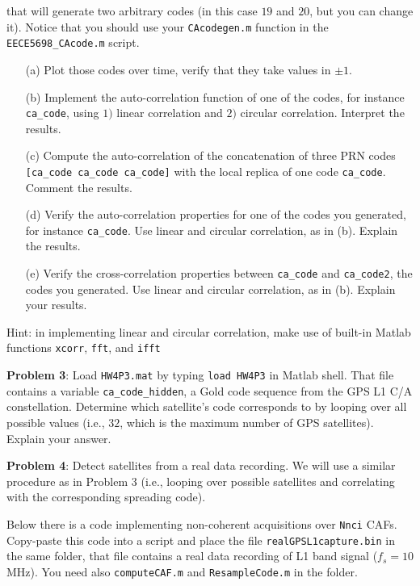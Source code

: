 \documentclass[11pt]{article}
\begin{document}
\noindent that will generate two arbitrary codes (in this case $19$ and $20$, but you can change it). Notice that you should use your \verb|CAcodegen.m| function in the \verb|EECE5698_CAcode.m| script. 

\begin{enumerate}
\item[(a)] Plot those codes over time, verify that they take values in $\pm1$. 
\item[(b)] Implement the auto-correlation function of one of the codes, for instance  \verb|ca_code|, using $1)$ linear correlation and $2)$ circular correlation. Interpret the results.
\item[(c)] Compute the auto-correlation of the concatenation of three PRN codes \verb|[ca_code ca_code ca_code]| with the local replica of one code \verb|ca_code|. Comment the results. 
\item[(d)] Verify the auto-correlation properties for one of the codes you generated, for instance \verb|ca_code|. Use linear and circular correlation, as in (b). Explain the results.
\item[(e)] Verify the cross-correlation properties between \verb|ca_code| and \verb|ca_code2|, the codes you generated. Use linear and circular correlation, as in (b). Explain your results.
\end{enumerate}

Hint: in implementing linear and circular correlation, make use of built-in Matlab functions \verb|xcorr|, \verb|fft|, and \verb|ifft|

\vspace*{.5cm}

\textbf{Problem 3}:
Load \verb|HW4P3.mat| by typing \verb|load HW4P3| in Matlab shell. That file contains a variable \verb|ca_code_hidden|, a Gold code sequence from the GPS L1 C/A constellation. Determine which satellite's code corresponds to by looping over all possible values (i.e., $32$, which is the maximum number of GPS satellites). Explain your answer.


\vspace*{.5cm}

\textbf{Problem 4}:
Detect satellites from a real data recording. We will use a similar procedure as in Problem 3 (i.e., looping over possible satellites and correlating with the corresponding spreading code). 

Below there is a code implementing non-coherent acquisitions over \verb|Nnci| CAFs. Copy-paste this code into a script and place the file \verb|realGPSL1capture.bin| in the same folder, that file contains a real data recording of L1 band signal ($f_s=10$ MHz). You need also \verb|computeCAF.m| and \verb|ResampleCode.m| in the folder.
\end{document}
